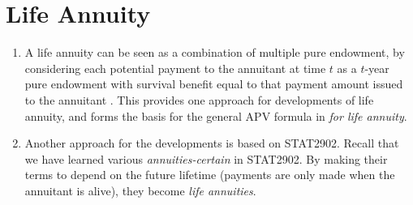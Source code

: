 \section{Life Annuity}
\label{sect:life-annuity}
\begin{enumerate}
\item A life annuity can be seen as a combination of multiple pure endowment,
by considering each potential payment to the annuitant  at time
\(t\) as a \(t\)-year pure endowment with survival benefit equal to that
payment amount issued to the annuitant . This provides one
approach for developments of life annuity, and forms the basis for the
general APV formula in  \emph{for life annuity}.


\item Another approach for the developments is based on STAT2902.
Recall that we have learned various \emph{annuities-certain} in STAT2902. By
making their terms to depend on the future lifetime (payments
 are only made when the annuitant  is
alive), they become \emph{life annuities}.
\end{enumerate}

